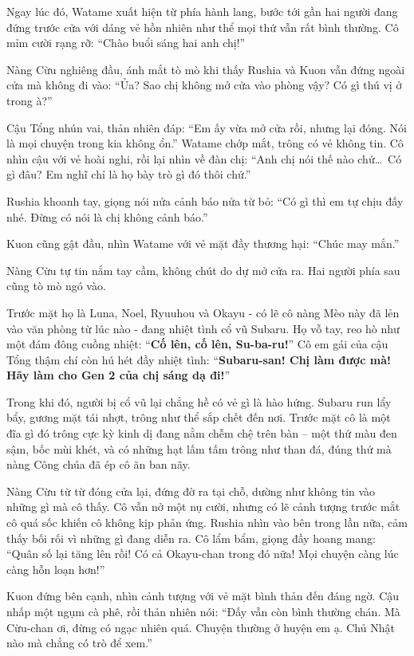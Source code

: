 \documentclass[../main.tex]{subfiles}
\begin{document}
Ngay lúc đó, Watame xuất hiện từ phía hành lang, bước tới gần hai người đang đứng trước cửa với dáng vẻ hồn nhiên như thể mọi thứ vẫn rất bình thường. Cô mỉm cười rạng rỡ: ``Chào buổi sáng hai anh chị!''


Nàng Cừu nghiêng đầu, ánh mắt tò mò khi thấy Rushia và Kuon vẫn đứng ngoài cửa mà không đi vào: ``Ủa? Sao chị không mở cửa vào phòng vậy? Có gì thú vị ở trong à?''

Cậu Tổng nhún vai, thản nhiên đáp: ``Em ấy vừa mở cửa rồi, nhưng lại đóng. Nói là mọi chuyện trong kia không ổn.'' Watame chớp mắt, trông có vẻ không tin. Cô nhìn cậu với vẻ hoài nghi, rồi lại nhìn về đàn chị: ``Anh chị nói thế nào chứ\dots\ Có gì đâu? Em nghĩ chỉ là họ bày trò gì đó thôi chứ.''

Rushia khoanh tay, giọng nói nửa cảnh báo nửa từ bỏ: ``Có gì thì em tự chịu đấy nhé. Đừng có nói là chị không cảnh báo.''

Kuon cũng gật đầu, nhìn Watame với vẻ mặt đầy thương hại: ``Chúc may mắn.''

Nàng Cừu tự tin nắm tay cầm, không chút do dự mở cửa ra. Hai người phía sau cũng tò mò ngó vào.

Trước mặt họ là Luna, Noel, Ryuuhou và Okayu - có lẽ cô nàng Mèo này đã lẻn vào văn phòng từ lúc nào - đang nhiệt tình cổ vũ Subaru. Họ vỗ tay, reo hò như một đám đông cuồng nhiệt: ``\textbf{Cố lên, cố lên, Su-ba-ru!}'' Cô em gái của cậu Tổng thậm chí còn hú hét đầy nhiệt tình: ``\textbf{Subaru-san! Chị làm được mà! Hãy làm cho Gen 2 của chị sáng dạ đi!}''

Trong khi đó, người bị cổ vũ lại chẳng hề có vẻ gì là hào hứng. Subaru run lẩy bẩy, gương mặt tái nhợt, trông như thể sắp chết đến nơi. Trước mặt cô là một đĩa gì đó trông cực kỳ kinh dị đang nằm chễm chệ trên bàn – một thứ màu đen sậm, bốc mùi khét, và có những hạt lấm tấm trông như than đá, đúng thứ mà nàng Công chúa đã ép cô ăn ban nãy.


Nàng Cừu từ từ đóng cửa lại, đứng đờ ra tại chỗ, dường như không tin vào những gì mà cô thấy. Cô vẫn nở một nụ cười, nhưng có lẽ cảnh tượng trước mắt cô quá sốc khiến cô không kịp phản ứng. Rushia nhìn vào bên trong lần nữa, cảm thấy bối rối vì những gì đang diễn ra. Cô lẩm bẩm, giọng đầy hoang mang: ``Quân số lại tăng lên rồi! Có cả Okayu-chan trong đó nữa! Mọi chuyện càng lúc càng hỗn loạn hơn!''

Kuon đứng bên cạnh, nhìn cảnh tượng với vẻ mặt bình thản đến đáng ngờ. Cậu nhấp một ngụm cà phê, rồi thản nhiên nói: ``Đấy vẫn còn bình thường chán. Mà Cừu-chan ơi, đừng có ngạc nhiên quá. Chuyện thường ở huyện em ạ. Chủ Nhật nào mà chẳng có trò để xem.''
\end{document}
